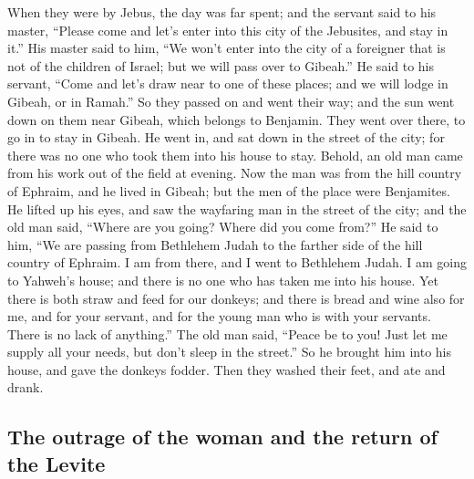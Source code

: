 When they were by Jebus, the day was far spent; and the
servant said to his master, ``Please come and let's enter into this city
of the Jebusites, and stay in it.''  His master said to
him, ``We won't enter into the city of a foreigner that is not of the
children of Israel; but we will pass over to Gibeah.'' 
He said to his servant, ``Come and let's draw near to one of these
places; and we will lodge in Gibeah, or in Ramah.''  So
they passed on and went their way; and the sun went down on them near
Gibeah, which belongs to Benjamin.  They went over there,
to go in to stay in Gibeah. He went in, and sat down in the street of
the city; for there was no one who took them into his house to stay.
 Behold, an old man came from his work out of the field
at evening. Now the man was from the hill country of Ephraim, and he
lived in Gibeah; but the men of the place were Benjamites.
 He lifted up his eyes, and saw the wayfaring man in the
street of the city; and the old man said, ``Where are you going? Where
did you come from?''  He said to him, ``We are passing
from Bethlehem Judah to the farther side of the hill country of Ephraim.
I am from there, and I went to Bethlehem Judah. I am going to Yahweh's
house; and there is no one who has taken me into his house.
 Yet there is both straw and feed for our donkeys; and
there is bread and wine also for me, and for your servant, and for the
young man who is with your servants. There is no lack of anything.''
 The old man said, ``Peace be to you! Just let me supply
all your needs, but don't sleep in the street.''  So he
brought him into his house, and gave the donkeys fodder. Then they
washed their feet, and ate and drank.

\hypertarget{the-outrage-of-the-woman-and-the-return-of-the-levite}{%
\subsection{The outrage of the woman and the return of the
Levite}\label{the-outrage-of-the-woman-and-the-return-of-the-levite}}

